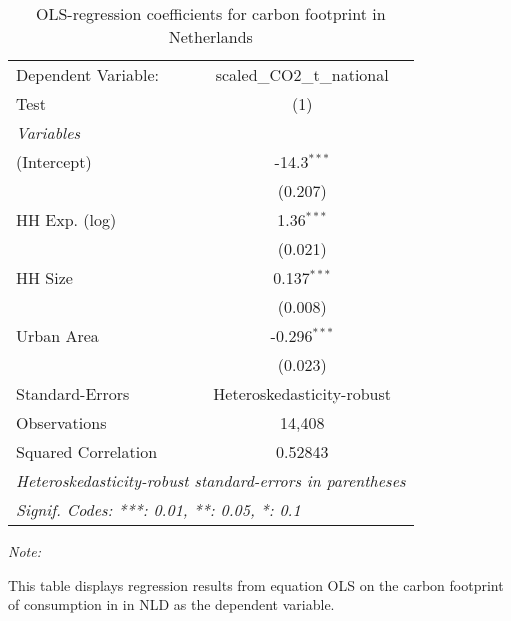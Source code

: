 
\begin{table}[htbp!]
   \centering
   \small
   \begin{adjustbox}{width = 1\textwidth, max height = 0.95\textheight, center}
      \begin{threeparttable}[b]
         \caption{\label{tab:OLS_2_NLD} OLS-regression coefficients for carbon footprint in Netherlands}
         \begin{tabular}{lc}
            \tabularnewline \midrule \midrule
            Dependent Variable: & scaled\_CO2\_t\_national\\     
            Test                & (1)\\  
            \midrule
            \emph{Variables}\\
            (Intercept)         & -14.3$^{***}$\\   
                                & (0.207)\\   
            HH Exp. (log)       & 1.36$^{***}$\\   
                                & (0.021)\\   
            HH Size             & 0.137$^{***}$\\   
                                & (0.008)\\   
            Urban Area          & -0.296$^{***}$\\   
                                & (0.023)\\   
            \midrule 
            Standard-Errors     & Heteroskedasticity-robust \\   
            Observations        & 14,408\\  
            Squared Correlation & 0.52843\\  
            \midrule \midrule
            \multicolumn{2}{l}{\emph{Heteroskedasticity-robust standard-errors in parentheses}}\\
            \multicolumn{2}{l}{\emph{Signif. Codes: ***: 0.01, **: 0.05, *: 0.1}}\\
         \end{tabular}
         
         \begin{tablenotes}\item \medskip \textit{Note:}
            \item This table displays regression results from equation OLS on the carbon footprint of consumption in  in NLD as the dependent variable.  
         \end{tablenotes}
      \end{threeparttable}
   \end{adjustbox}
\end{table}


